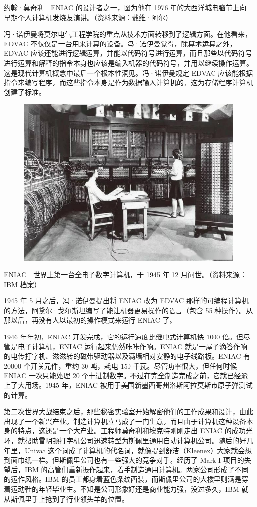 \documentclass[12pt,UTF8]{ctexbook}
\begin{document}
约翰·莫奇利　ENIAC 的设计者之一，图为他在 1976 年的大西洋城电脑节上向早期个人计算机发烧友演讲。（资料来源：戴维·阿尔）

冯·诺伊曼将莫尔电气工程学院的重点从技术方面转移到了逻辑方面。在他看来，EDVAC 不仅仅是一台用来计算的设备。冯·诺伊曼觉得，除算术运算之外，EDVAC 应该还能进行逻辑运算，并能以代码符号进行运算，而且那些以代码符号进行运算和解释的指令本身也应该是编入机器的代码符号，并用以继续操作运算。这是现代计算机概念中最后一个根本性洞见。冯·诺伊曼规定 EDVAC 应该能根据指令来编写程序，而这些指令本身是作为数据输入计算机的，这为存储程序计算机创建了标准。

\begin{figure}[htbp]
	\centering
	\includegraphics[width=0.7\linewidth]{8}
	\caption{}
	\label{fig:1}
\end{figure}

ENIAC　世界上第一台全电子数字计算机，于 1945 年 12 月问世。（资料来源：IBM 档案）

1945 年 5 月之后，冯·诺伊曼提出将 ENIAC 改为 EDVAC 那样的可编程计算机的方法，阿黛尔·戈尔斯坦编写了能让机器更易操作的语言（包含 55 种操作）。从那以后，再没有人以最初的操作模式来运行 ENIAC 了。

1946 年年初，ENIAC 开发完成，它的运行速度比继电式计算机快 1000 倍。但尽管是电子计算机，ENIAC 运行起来仍然咔咔作响。ENIAC 就是一屋子滴答作响的电传打字机、滋滋转的磁带驱动器以及满墙相对安静的电子线路板。ENIAC 有 20000 个开关元件，重约 30 吨，耗电 150 千瓦。尽管功率很大，但任何时候 ENIAC 一次只能处理 20 个十进制数字。不过在完全制造完成之前，它就已经派上了大用场。1945 年，ENIAC 被用于美国新墨西哥州洛斯阿拉莫斯市原子弹测试的计算。

第二次世界大战结束之后，那些秘密实验室开始解密他们的工作成果和设计，由此出现了一个新兴产业。制造计算机立马成了一门生意，而且由于计算机这种设备本身的特点，这还是一个大产业。工程师莫奇利和埃克特刚刚走出 ENIAC 的成功光环，就帮助雷明顿打字机公司迅速转型为斯佩里通用自动计算机公司。随后的好几年里，Univac 这个词成了计算机的代名词，就像提到舒洁（Kleenex）大家就会想到面巾纸一样。但斯佩里公司也有一些强大的竞争对手。经历了 Mark I 项目的失望后，IBM 的高管们重新振作起来，着手制造通用计算机。两家公司形成了不同的运作风格。IBM 的员工都身着蓝色条纹西装，而斯佩里公司的大楼里则满是穿着运动鞋的年轻毕业生。不知是公司形象好还是商业能力强，没过多久，IBM 就从斯佩里手上抢到了行业领头羊的位置。
\end{document}
